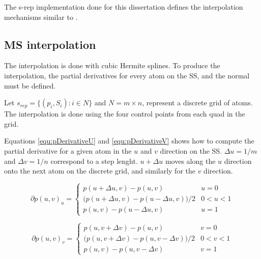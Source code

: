 The s-rep implementation done for this dissertation defines
the interpolation mechanisms similar to \cite{han2006interpolation}.

\subsection{MS interpolation}

The interpolation is done with cubic Hermite splines.
To produce the interpolation, the partial derivatives for every atom on the SS, 
and the normal must be defined.

Let $s_{rep} = \{(p_i, S_i) : i \in N\}$ and $N = m \times n$, 
represent a discrete grid of atoms.
The interpolation is done using the four control points from each quad in the grid. 

Equations \ref{equ:pDerivativeU} and \ref{equ:pDerivativeV} shows how to compute the partial derivative for a given atom 
in the $u$ and $v$ direction on the SS. $\Delta u = 1/m$ and $\Delta v = 1/n$ 
correspond to a step lenght. $u + \Delta u$ moves along the $u$ direction onto 
the next atom on the discrete grid, and similarly for the $v$ direction.

\begin{equation}
 \partial p(u, v)_u = \left \{ \begin{array}{ll}
                      p(u + \Delta u, v) - p(u , v) & u = 0\\
                      \big (p(u + \Delta u, v) - p(u - \Delta u, v)\big )/2 & 0 < u < 1 \\
                      p(u, v) - p(u - \Delta u, v) & u = 1
                     \end{array} \right .
\label{equ:pDerivativeU}
\end{equation}

\begin{equation}
 \partial p(u, v)_v = \left \{ \begin{array}{ll}
                      p(u, v + \Delta v) - p(u, v) & v = 0\\
                      \big (p(u, v + \Delta v) - p(u, v - \Delta v) \big ) /2 & 0 < v < 1 \\
                      p(u, v) - p(u, v - \Delta v) & v = 1
                     \end{array} \right .
\label{equ:pDerivativeV}
\end{equation}

